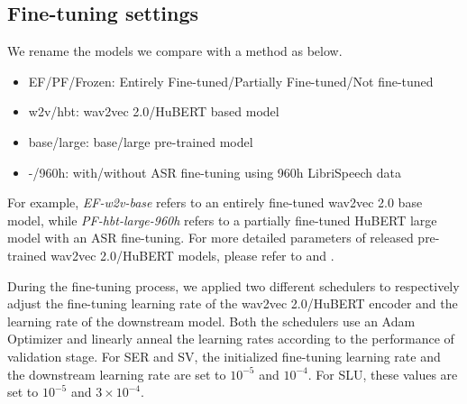 \documentclass{article}
\begin{document}
\subsection{Fine-tuning settings}
We rename the models we compare with a method as below.
\begin{itemize}
    \item  EF/PF/Frozen: Entirely Fine-tuned/Partially Fine-tuned/Not fine-tuned
    \item  w2v/hbt: wav2vec 2.0/HuBERT based model
    \item  base/large: base/large pre-trained model
    \item  -/960h: with/without ASR fine-tuning using 960h LibriSpeech data
\end{itemize}

For example, \textit{EF-w2v-base} refers to an entirely fine-tuned wav2vec 2.0 base model, while \textit{PF-hbt-large-960h} refers to a partially fine-tuned HuBERT large model with an ASR fine-tuning. For more detailed parameters of released pre-trained wav2vec 2.0/HuBERT models, please refer to \cite{wav2vec2} and \cite{HuBERT}.

During the fine-tuning process, we applied two different schedulers to respectively adjust the fine-tuning learning rate of the wav2vec 2.0/HuBERT encoder and the learning rate of the downstream model. Both the schedulers use an Adam Optimizer and linearly anneal the learning rates according to the performance of validation stage. For SER and SV, the initialized fine-tuning learning rate and the downstream learning rate are set to $10^{-5}$ and $10^{-4}$. For SLU, these values are set to $10^{-5}$ and $3 \times 10^{-4}$.
\end{document}
